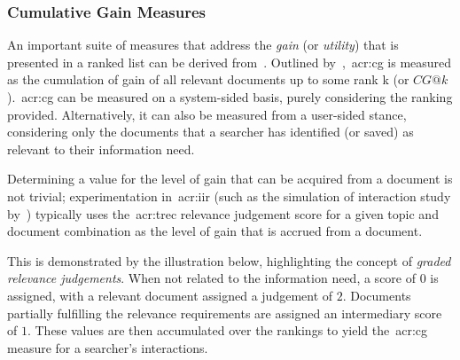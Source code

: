 \subsubsection{Cumulative Gain Measures}\label{sec:ir_background:evaluation:system:cg}
An important suite of measures that address the \emph{gain} (or \emph{utility}) that is presented in a ranked list can be derived from~. Outlined by~\cite{jarvelin2000cg, jarvelin2002cg},~\gls{acr:cg} is measured as the cumulation of gain of all relevant documents up to some rank k (or $CG@k$).~\gls{acr:cg} can be measured on a system-sided basis, purely considering the ranking provided. Alternatively, it can also be measured from a user-sided stance, considering only the documents that a searcher has identified (or saved) as relevant to their information need.

Determining a value for the level of gain that can be acquired from a document is not trivial; experimentation in~\gls{acr:iir} (such as the simulation of interaction study by~\cite{pakkonen2015behavioural_dimensions}) typically uses the~\gls{acr:trec} relevance judgement score for a given topic and document combination as the level of gain that is accrued from a document.

This is demonstrated by the illustration below, highlighting the concept of \emph{graded relevance judgements}. When not related to the information need, a score of $0$ is assigned, with a relevant document assigned a judgement of $2$. Documents partially fulfilling the relevance requirements are assigned an intermediary score of $1$. These values are then accumulated over the rankings to yield the~\gls{acr:cg} measure for a searcher's interactions.

\vspace{5mm}
\begin{figure}[h!]
    \centering
    \label{fig:graded}
\end{figure}

